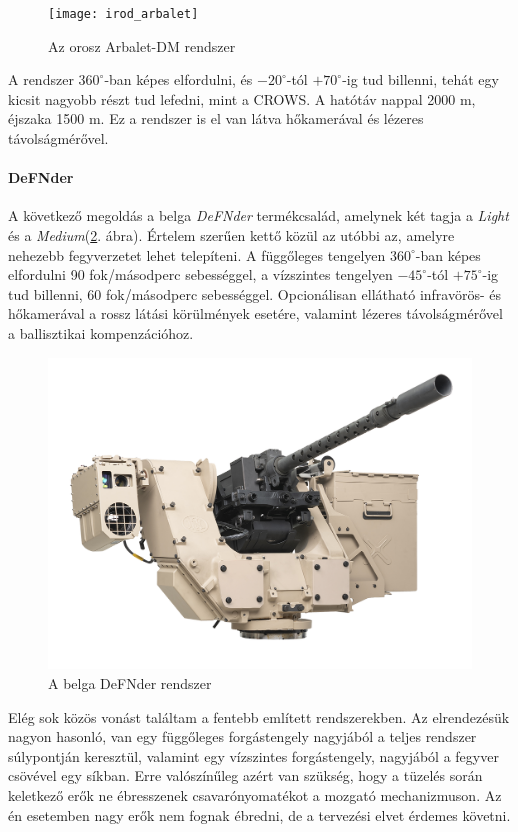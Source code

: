 \documentclass[12pt,a4paper]{article}
\begin{document}
\begin{figure}[h!]
	\centering
	\texttt{[image: irod\_arbalet]}
	\caption{Az orosz Arbalet-DM rendszer \cite{arbalet}}
	\label{fig:irod_arbalet}
\end{figure}

A rendszer $360^\circ$-ban képes elfordulni, és $-20^{\circ}$-tól $+70^{\circ}$-ig tud billenni, tehát egy kicsit nagyobb részt tud lefedni, mint a CROWS. A hatótáv nappal 2000 m, éjszaka 1500 m. Ez a rendszer is el van látva hőkamerával és lézeres távolságmérővel.

\paragraph{DeFNder \cite{defnder}}
A következő megoldás a belga \textsl{DeFNder} termékcsalád, amelynek két tagja a \textsl{Light} és a \textsl{Medium}(\ref{fig:irod_defnder}. ábra). Értelem szerűen kettő közül az utóbbi az, amelyre nehezebb fegyverzetet lehet telepíteni. A függőleges tengelyen $360^\circ$-ban képes elfordulni 90 fok/másodperc sebességgel, a vízszintes tengelyen $-45^{\circ}$-tól $+75^{\circ}$-ig tud billenni, 60 fok/másodperc sebességgel. Opcionálisan ellátható infravörös- és hőkamerával a rossz látási körülmények esetére, valamint lézeres távolságmérővel a ballisztikai kompenzációhoz.
\begin{figure}[h!]
	\centering
	\includegraphics[width=1\linewidth]{irod_defnder}
	\caption{A belga DeFNder rendszer \cite{defnder}}
	\label{fig:irod_defnder}
\end{figure}

Elég sok közös vonást találtam a fentebb említett rendszerekben. Az elrendezésük nagyon hasonló, van egy függőleges forgástengely nagyjából a teljes rendszer súlypontján keresztül, valamint egy vízszintes forgástengely, nagyjából a fegyver csövével egy síkban. Erre valószínűleg azért van szükség, hogy a tüzelés során keletkező erők ne ébresszenek csavarónyomatékot a mozgató mechanizmuson. Az én esetemben nagy erők nem fognak ébredni, de a tervezési elvet érdemes követni.
\end{document}
